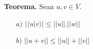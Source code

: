 \textbf{Teorema.} Sean $u, v \in V$.

\begin{itemize}
	\item[$a)$] $|\langle u|v \rangle|\leq ||u||.||w||$
	\item[$b)$] $||u + v|| \leq ||u|| + ||v||$
\end{itemize}